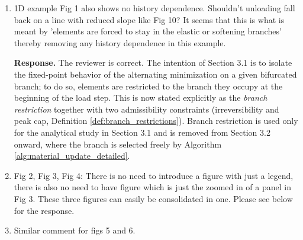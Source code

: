 \documentclass[10pt]{article}
\begin{document}
\begin{enumerate}
\color{black}
\item 1D example Fig 1 also shows no history dependence. Shouldn't unloading fall back on a line with reduced slope like Fig 10? It seems that this is what is meant by 'elements are forced to stay in the elastic or softening branches' thereby removing any history dependence in this example.

\color{blue}
\textbf{Response.} The reviewer is correct. The intention of Section 3.1 is to isolate the fixed-point behavior of the alternating minimization on a given bifurcated branch; to do so, elements are restricted to the branch they occupy at the beginning of the load step. This is now stated explicitly as the \emph{branch restriction} together with two admissibility constraints (irreversibility and peak cap, Definition \ref{def:branch_restrictions}). Branch restriction is used only for the analytical study  in Section 3.1 and is removed from Section 3.2 onward, where the branch is selected freely by Algorithm \ref{alg:material_update_detailed}.

\color{black}
\item Fig 2, Fig 3, Fig 4: There is no need to introduce a figure with just a legend, there is also no need to have figure which is just the zoomed in of a panel in Fig 3. These three figures can easily be consolidated in one.
\color{blue}
Please see below for the response.

\color{black}
\item Similar comment for figs 5 and 6.


\end{enumerate}
\end{document}
